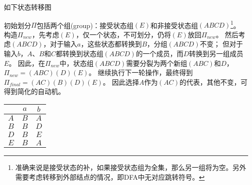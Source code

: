 \begin{example}
如下状态转移图
\begin{center}
\end{center}
\end{example}
\begin{analysis}
初始划分$\Pi$包括两个组(group)：接受状态组$(E)$和非接受状态组$(ABCD)$\footnote{准确来说是接受状态的补，如果接受状态组为全集，那么另一组将为空。另外需要考虑转移到外部结点的情况，即DFA中无对应跳转符号。}。
构造$\Pi_{new}$，先考虑$(E)$，仅一个状态，不可划分，仍将$(E)$放回$\Pi_{new}$。
然后考虑$(ABCD)$，对于输入$a$，这些状态都转换到$B$，分组$(ABCD)$不变；
但对于输入$b$，$A$、$B$和$C$都转换到状态组$(ABCD)$的一个成员，而$D$转换到另一组成员$E$。
因此，在$\Pi_{new}$中，状态组$(ABCD)$需要分裂为两个新组$(ABC)$和$D$，$\Pi_{new}=(ABC)(D)(E)$。
继续执行下一轮操作，最终得到$\Pi_{final}=(AC)(B)(D)(E)$。
因此选择$A$作为$(AC)$的代表，其他不变，可得到简化的自动机。
\begin{center}
\begin{tabular}{c|cc}\hline
 & $a$ & $b$\\\hline\hline
$A$ & $B$ & $A$\\\hline
$B$ & $B$ & $D$\\\hline
$D$ & $B$ & $E$\\\hline
$E$ & $B$ & $A$\\\hline
\end{tabular}
\end{center}
\end{analysis}